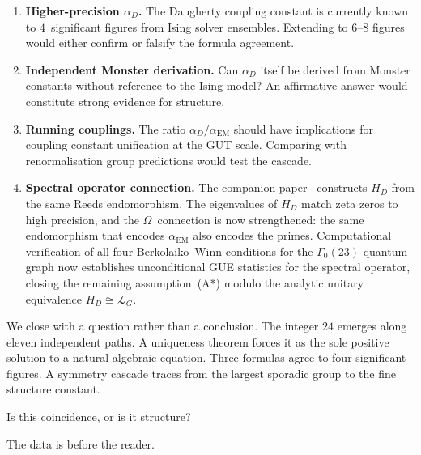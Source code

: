 \documentclass[11pt,a4paper]{article}
\theoremstyle{plain}
\theoremstyle{remark}
\renewcommand{\Omega}{\varOmega}
\newcommand{\aD}{\alpha_D}
\newcommand{\aEM}{\alpha_{\mathrm{EM}}}
\begin{document}
\begin{enumerate}[label=(\roman*),itemsep=4pt]
\item \textbf{Higher-precision $\aD$.}
  The Daugherty coupling constant is currently known to $4$~significant
  figures from Ising solver ensembles.  Extending to $6$--$8$ figures
  would either confirm or falsify the formula agreement.

\item \textbf{Independent Monster derivation.}
  Can $\aD$ itself be derived from Monster constants without reference
  to the Ising model?  An affirmative answer would constitute strong
  evidence for structure.

\item \textbf{Running couplings.}
  The ratio $\aD/\aEM$ should have implications for coupling constant
  unification at the GUT scale.  Comparing with renormalisation group
  predictions would test the cascade.

\item \textbf{Spectral operator connection.}
  The companion paper~\cite{DHR2026a} constructs $H_D$ from the same
  Reeds endomorphism.  The eigenvalues of $H_D$ match zeta zeros to
  high precision, and the $\Omega$~connection is now strengthened: the
  same endomorphism that encodes $\aEM$ also encodes the primes.
  Computational verification of all four Berkolaiko--Winn conditions
  for the $\Gamma_0(23)$ quantum graph now establishes unconditional
  GUE statistics for the spectral operator, closing the remaining
  assumption~(A*) modulo the analytic unitary equivalence
  $H_D\cong\mathcal{L}_G$.
\end{enumerate}

\medskip
We close with a question rather than a conclusion.  The integer $24$
emerges along eleven independent paths.  A uniqueness theorem forces it
as the sole positive solution to a natural algebraic equation.  Three
formulas agree to four significant figures.  A symmetry cascade traces
from the largest sporadic group to the fine structure constant.

\smallskip
Is this coincidence, or is it structure?

\smallskip
The data is before the reader.
\end{document}
